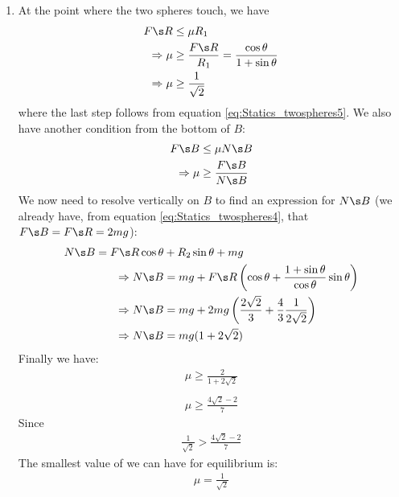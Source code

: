 \begin{problem} [A1988FMIIQ1a]
{\begin{enumerate}
Substituting in $m$ = 5~kg gives $N_A$ = 5.75~kg
\item
At the point where the two spheres touch, we have
\begin{align*}
 F\s R&\le \mu R_1 \\
\Rightarrow \mu&\ge\frac{F\s R}{R_1}=\frac{\cos\theta}{1+\sin\theta} \\
\Rightarrow \mu&\ge\frac{1}{\sqrt 2}
\end{align*}
where the last step follows from equation \eqref{eq:Statics_twospheres5}. We also have another condition from the bottom of $B$:
\begin{align*}
F\s B&\le\mu N\s B \\
\Rightarrow \mu&\ge\frac{F\s B}{N\s B}
\end{align*}
We now need to resolve vertically on $B$ to find an expression for $N\s B$ (we already have, from equation \eqref{eq:Statics_twospheres4}, that $F\s B=F\s R=2mg$):
\begin{align*}
N\s B=F\s R\cos\theta&+R_2\sin\theta+mg \\
\Rightarrow N\s B&=mg+F\s R\left(\cos\theta+\frac{1+\sin\theta}{\cos\theta}\sin\theta\right) \\
\Rightarrow N\s B&=mg+2mg\left(\frac{2\sqrt 2}{3}+\frac{4}{3}\frac{1}{2\sqrt 2}\right) \\
\Rightarrow N\s B&=mg(1+2\sqrt 2)
\end{align*}
Finally we have:
\begin{align*}
\mu\ge\frac{2}{1+2\sqrt{2}} \\
\\ \mu \ge \frac{4\sqrt{2}-2}{7}
\end{align*}
Since 
\begin{align*}
\frac{1}{\sqrt{2}} > \frac{4\sqrt{2}-2}{7}
\end{align*}
The smallest value of \vari{\mu} we can have for equilibrium is:
\begin{align*}
\mu = \frac{1}{\sqrt{2}}
\end{align*}

\end{enumerate}
}
\end{problem}